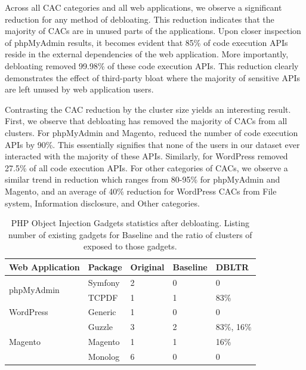 Across all CAC categories and all web applications, we observe a significant reduction for any method of debloating. 
This reduction indicates that the majority of CACs are in unused parts of the applications. Upon closer inspection of phpMyAdmin results, it becomes evident that 85\% of code execution APIs reside in the external dependencies of the web application. 
More importantly, debloating removed 99.98\% of these code execution APIs. 
This reduction clearly demonstrates the effect of third-party bloat where the majority of sensitive APIs are left unused by web application users. 

Contrasting the CAC reduction by the cluster size yields an interesting result. 
First, we observe that debloating has removed the majority of CACs from all clusters. 
For phpMyAdmin and Magento, \sys{} reduced the number of code execution APIs by 90\%. 
This essentially signifies that none of the users in our dataset ever interacted with the majority of these APIs. 
Similarly, for WordPress \sys{} removed 27.5\% of all code execution APIs. 
For other categories of CACs, we observe a similar trend in reduction which ranges from 80-95\% for phpMyAdmin and Magento, and an average of 40\% reduction for WordPress CACs from File system, Information disclosure, and Other categories. 

\begin{table}[]
    \centering
    \caption{PHP Object Injection Gadgets statistics after debloating. Listing number of existing gadgets for Baseline and the ratio of clusters of \sys{} exposed to those gadgets.}
    \label{tab:poi_gadgets}
    \begin{tabular}{|l|l|l|l|l|}
        \hline
        Web Application             & Package & Original & Baseline & DBLTR \\ \hline
        \multirow{2}{*}{phpMyAdmin} & Symfony & 2        & 0        & 0     \\ \cline{2-5} 
                                    & TCPDF   & 1        & 1        & 83\%  \\ \hline
        WordPress                   & Generic & 1        & 0        & 0     \\ \hline
        \multirow{3}{*}{Magento}    & Guzzle  & 3        & 2        & 83\%, 16\% \\ \cline{2-5} 
                                    & Magento & 1        & 1        & 16\%  \\ \cline{2-5} 
                                    & Monolog & 6        & 0        & 0     \\ \hline
        \end{tabular}
\end{table}

